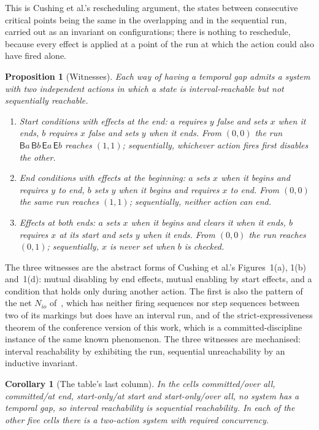 \documentclass[preprint,12pt]{elsarticle}
\theoremstyle{plain}
\newtheorem{proposition}[theorem]{Proposition}
\newtheorem{corollary}[theorem]{Corollary}
\theoremstyle{definition}
\newcommand{\B}[1]{\mathsf{B}#1}
\newcommand{\E}[1]{\mathsf{E}#1}
\begin{document}
This is Cushing et al.'s rescheduling argument, the states between consecutive critical points being the same in the overlapping and in the sequential run, carried out as an invariant on configurations; there is nothing to reschedule, because every effect is applied at a point of the run at which the action could also have fired alone.

\begin{proposition}[Witnesses]
\label{prop:gap-witnesses}
Each way of having a temporal gap admits a system with two independent actions in which a state is interval-reachable but not sequentially reachable.
\begin{enumerate}
\item[(i)] Start conditions with effects at the end: $a$ requires $y$ false and sets $x$ when it ends, $b$ requires $x$ false and sets $y$ when it ends. From $(0, 0)$ the run $\B{a}\,\B{b}\,\E{a}\,\E{b}$ reaches $(1, 1)$; sequentially, whichever action fires first disables the other.
\item[(ii)] End conditions with effects at the beginning: $a$ sets $x$ when it begins and requires $y$ to end, $b$ sets $y$ when it begins and requires $x$ to end. From $(0, 0)$ the same run reaches $(1, 1)$; sequentially, neither action can end.
\item[(iii)] Effects at both ends: $a$ sets $x$ when it begins and clears it when it ends, $b$ requires $x$ at its start and sets $y$ when it ends. From $(0, 0)$ the run reaches $(0, 1)$; sequentially, $x$ is never set when $b$ is checked.
\end{enumerate}
\end{proposition}

The three witnesses are the abstract forms of Cushing et al.'s Figures~1(a), 1(b) and~1(d): mutual disabling by end effects, mutual enabling by start effects, and a condition that holds only during another action. The first is also the pattern of the net $N_{io}$ of~\cite{AlqarniJanicki2018}, which has neither firing sequences nor step sequences between two of its markings but does have an interval run, and of the strict-expressiveness theorem of the conference version of this work, which is a committed-discipline instance of the same known phenomenon. The three witnesses are mechanised: interval reachability by exhibiting the run, sequential unreachability by an inductive invariant.

\begin{corollary}[The table's last column]
\label{cor:table-gap}
In the cells committed/over all, committed/at end, start-only/at start and start-only/over all, no system has a temporal gap, so interval reachability is sequential reachability. In each of the other five cells there is a two-action system with required concurrency.
\end{corollary}
\end{document}
